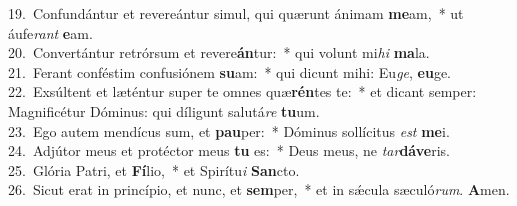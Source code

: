 {19.~}Confundántur et revereántur simul, qui quærunt ánimam \textbf{me}am,~* ut áufe\textit{rant} \textbf{e}am.\\
{20.~}Convertántur retrórsum et revere\textbf{án}tur:~* qui volunt mi\textit{hi} \textbf{ma}la.\\
{21.~}Ferant conféstim confusiónem \textbf{su}am:~* qui dicunt mihi: Eu\textit{ge}, \textbf{e}\textbf{u}ge.\\
{22.~}Exsúltent et læténtur super te omnes quæ\textbf{rén}tes te:~* et dicant semper: Magnificétur Dóminus: qui díligunt salutá\textit{re} \textbf{tu}um.\\
{23.~}Ego autem mendícus sum, et \textbf{pau}per:~* Dóminus sollícitus \textit{est} \textbf{me}i.\\
{24.~}Adjútor meus et protéctor meus \textbf{tu} es:~* Deus meus, ne \textit{tar}\textbf{dá}\textbf{ve}ris.\\
{25.~}Glória Patri, et \textbf{Fí}lio,~* et Spirítu\textit{i} \textbf{San}cto.\\
{26.~}Sicut erat in princípio, et nunc, et \textbf{sem}per,~* et in sǽcula sæculó\textit{rum}. \textbf{A}men.\\
